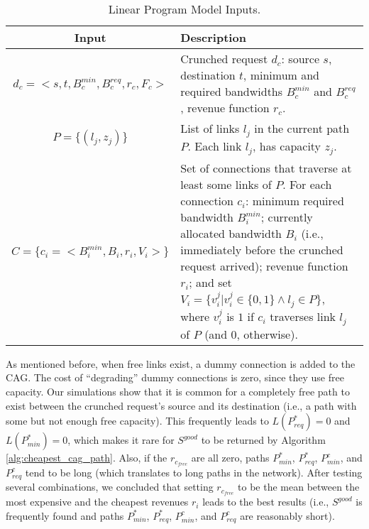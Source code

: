\documentclass[journal]{IEEEtran}
\begin{document}
 \begin{table*}[t]\scriptsize
 \centering
 \caption{Linear Program Model Inputs.}
 \label{tab:inputs}
  \begin{tabularx}{\textwidth}{cX}%
   \hline
   \hline
 	\textbf{Input}	&\textbf{Description} \\ \hline
 $d_c = <s, t, B_{c}^{min}, B_{c}^{req}, r_{c}, F_{c}>$ & Crunched request $d_c$: source $s$, destination $t$, minimum and required bandwidths $B_{c}^{min}$ and $B_{c}^{req}$, revenue function $r_{c}$.\\
 $P = \{(l_j, z_j)\}$ & List of links $l_j$ in the current path $P$. Each link $l_j$, has capacity $z_j$.\\
 $C = \{c_i = <B_{i}^{min}, B_{i}, r_{i}, V_{i}>\}$ & Set of connections that traverse at least some links of $P$. For each connection $c_i$: minimum required bandwidth $B_{i}^{min}$; currently allocated bandwidth $B_{i}$ (i.e., immediately before the 
crunched request arrived); revenue function $r_{i}$; and set $V_{i} = \{ v_{i}^{j} | v_{i}^{j} \in \{0,1\} \land l_j \in P\}$, where $v_{i}^{j}$ is $1$ if $c_i$ traverses link $l_j$ of $P$ (and 0, otherwise).\\
   \hline
  \end{tabularx}
 \end{table*}

As mentioned before, when free links exist, a dummy connection is added to the CAG. The cost of ``degrading'' dummy connections is zero, since they use free capacity. Our simulations show that it is common for a completely free path to exist between the crunched request's source and its destination (i.e., a path with some but not enough free capacity). This frequently leads to $L(P^{*}_{req})=0$ and $L(P^{*}_{min})=0$, which makes it rare for $S^{good}$ to be returned by Algorithm \ref{alg:cheapest_cag_path}. Also, if the $r_{c_{free}}$ are all zero, paths $P^{*}_{min}$, $P^{*}_{req}$, $P^{c}_{min}$, and $P^{c}_{req}$ tend to be long (which translates to long paths in the network). After testing several combinations, we concluded that setting $r_{c_{free}}$ to be the mean between the most expensive and the cheapest revenues $r_i$ leads to the best results (i.e., $S^{good}$ is frequently found and paths $P^{*}_{min}$, $P^{*}_{req}$, $P^{c}_{min}$, and $P^{c}_{req}$ are reasonably short). 
\end{document}
